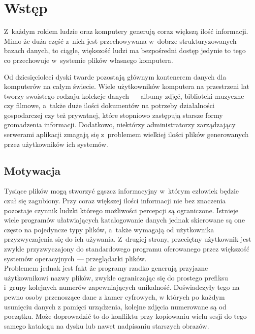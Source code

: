 \chapter{Wstęp}
\label{wstep}

\par
 Z~każdym rokiem ludzie oraz komputery generują coraz większą ilość informacji.
Mimo że duża część z~nich jest przechowywana w~dobrze strukturyzowanych bazach danych, to ciągle, większość ludzi ma bezpośredni dostęp jedynie to tego co przechowuje w~systemie plików własnego komputera.
\par
Od dziesięcioleci dyski twarde pozostają głównym kontenerem danych dla komputerów na całym świecie.
Wiele użytkowników komputera na przestrzeni lat tworzy swoistego rodzaju kolekcje danych --- albumy zdjęć, biblioteki muzyczne czy filmowe, a~także duże ilości dokumentów na potrzeby działalności gospodarczej czy też prywatnej, które stopniowo zastępują starsze formy gromadzenia informacji. Dodatkowo, niektórzy administratorzy zarządzający serwerami aplikacji zmagają się z~problemem wielkiej ilości plików generowanych przez użytkowników ich systemów.

\section{Motywacja}
\label{motywacja}
\par
Tysiące plików mogą stworzyć gąszcz informacyjny w~którym człowiek będzie czuł się zagubiony. Przy coraz większej ilości informacji nie bez znaczenia pozostaje czynnik ludzki którego możliwości percepcji są ograniczone.
Istnieje wiele programów ułatwiających katalogowanie danych jednak skierowane są one często na pojedyncze typy plików, a~także wymagają od użytkownika przyzwyczajenia się do ich używania. Z~drugiej strony, przeciętny użytkownik jest zwykle przyzwyczajony do standardowego programu oferowanego przez większość systemów operacyjnych --- przeglądarki plików.\\

Problemem jednak jest fakt że programy rzadko generują przyjazne użytkownikowi nazwy plików, zwykle ograniczając się do prostego prefiksu i~grupy kolejnych numerów zapewniających unikalność.
Doświadczyły tego na pewno osoby przenoszące dane z kamer cyfrowych, w których po każdym usunięciu danych z pamięci urządzenia, kolejne zdjęcia numerowane są od początku. Może doprowadzić to do konfliktu przy kopiowaniu wielu sesji do tego samego katalogu na dysku lub nawet nadpisaniu starszych obrazów.


